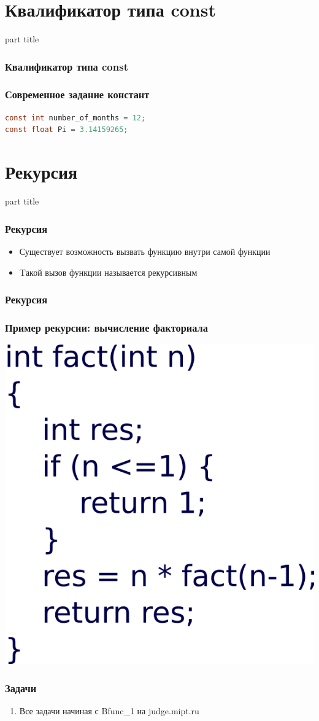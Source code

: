 \documentclass[14pt,pdf,hyperref={unicode}]{beamer}
\begin{document}
\section{Квалификатор типа const}
\begin{frame}
\begin{center}
\begin{beamercolorbox}[sep=8pt,center]{part
title}
\insertsection
\end{beamercolorbox}
\end{center}
\end{frame}

\begin{frame}[fragile]
\frametitle{Квалификатор типа const} 
\frametitle{Современное задание констант}
\begin{lstlisting}[language=C,basicstyle=\ttfamily,keywordstyle=\color{blue}]
const int number_of_months = 12;
const float Pi = 3.14159265;
\end{lstlisting}
\end{frame}

\section{Рекурсия}
\begin{frame}
\begin{center}
\begin{beamercolorbox}[sep=8pt,center]{part
title}
\insertsection
\end{beamercolorbox}
\end{center}
\end{frame}


\begin{frame}[fragile]
\frametitle{Рекурсия} 
\begin{itemize}
\item Существует возможность вызвать функцию внутри самой функции
\item Tакой вызов функции называется рекурсивным
\end{itemize}
\end{frame}

\begin{frame}[fragile]
\frametitle{Рекурсия} 
\frametitle{Пример рекурсии: вычисление факториала} 
\begin{center}
\includegraphics[width=0.45\linewidth]{images/function_recursive.png}
\end{center}
\end{frame}



\begin{frame}
\frametitle{Задачи} 
\begin{enumerate}
\item Все задачи начиная с Bfunc\_1 на judge.mipt.ru
\end{enumerate}

\end{frame}
\end{document}

